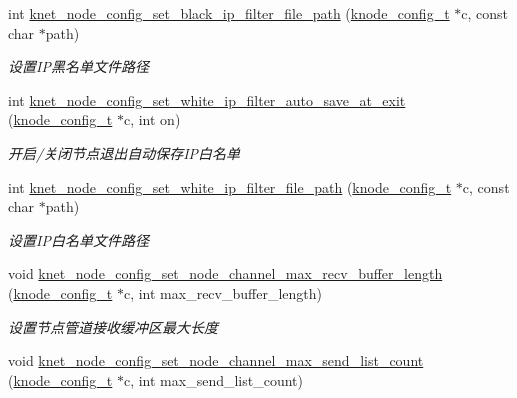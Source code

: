 \begin{DoxyCompactItemize}
int \hyperlink{a00106_a02d16d9dda1d4dbc851f474be0e5e095_a02d16d9dda1d4dbc851f474be0e5e095}{knet\+\_\+node\+\_\+config\+\_\+set\+\_\+black\+\_\+ip\+\_\+filter\+\_\+file\+\_\+path} (\hyperlink{a00066_af1cfaee0eb1c76ebf06076b95cc47ee1_af1cfaee0eb1c76ebf06076b95cc47ee1}{knode\+\_\+config\+\_\+t} $\ast$c, const char $\ast$path)
\begin{DoxyCompactList}\small\item\em 设置\+I\+P黑名单文件路径 \end{DoxyCompactList}\item 
int \hyperlink{a00106_ad81fc1af6cb037ce2a6b36bc6e34a8f9_ad81fc1af6cb037ce2a6b36bc6e34a8f9}{knet\+\_\+node\+\_\+config\+\_\+set\+\_\+white\+\_\+ip\+\_\+filter\+\_\+auto\+\_\+save\+\_\+at\+\_\+exit} (\hyperlink{a00066_af1cfaee0eb1c76ebf06076b95cc47ee1_af1cfaee0eb1c76ebf06076b95cc47ee1}{knode\+\_\+config\+\_\+t} $\ast$c, int on)
\begin{DoxyCompactList}\small\item\em 开启/关闭节点退出自动保存\+I\+P白名单 \end{DoxyCompactList}\item 
int \hyperlink{a00106_af15c35a97f4067e5285c1ade6bd6cfaf_af15c35a97f4067e5285c1ade6bd6cfaf}{knet\+\_\+node\+\_\+config\+\_\+set\+\_\+white\+\_\+ip\+\_\+filter\+\_\+file\+\_\+path} (\hyperlink{a00066_af1cfaee0eb1c76ebf06076b95cc47ee1_af1cfaee0eb1c76ebf06076b95cc47ee1}{knode\+\_\+config\+\_\+t} $\ast$c, const char $\ast$path)
\begin{DoxyCompactList}\small\item\em 设置\+I\+P白名单文件路径 \end{DoxyCompactList}\item 
void \hyperlink{a00106_af87f15267112e0caf225c67083fdf3ba_af87f15267112e0caf225c67083fdf3ba}{knet\+\_\+node\+\_\+config\+\_\+set\+\_\+node\+\_\+channel\+\_\+max\+\_\+recv\+\_\+buffer\+\_\+length} (\hyperlink{a00066_af1cfaee0eb1c76ebf06076b95cc47ee1_af1cfaee0eb1c76ebf06076b95cc47ee1}{knode\+\_\+config\+\_\+t} $\ast$c, int max\+\_\+recv\+\_\+buffer\+\_\+length)
\begin{DoxyCompactList}\small\item\em 设置节点管道接收缓冲区最大长度 \end{DoxyCompactList}\item 
void \hyperlink{a00106_a0b340048d9d40d2443182e7193fb9129_a0b340048d9d40d2443182e7193fb9129}{knet\+\_\+node\+\_\+config\+\_\+set\+\_\+node\+\_\+channel\+\_\+max\+\_\+send\+\_\+list\+\_\+count} (\hyperlink{a00066_af1cfaee0eb1c76ebf06076b95cc47ee1_af1cfaee0eb1c76ebf06076b95cc47ee1}{knode\+\_\+config\+\_\+t} $\ast$c, int max\+\_\+send\+\_\+list\+\_\+count)

\end{DoxyCompactItemize}
